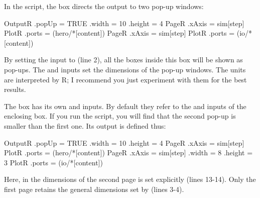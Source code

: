 In the  script, the  box directs the output to two pop-up windows:

\lstset{numbers=left}
\begin{boxscript}
OutputR {
	.popUp = TRUE
	.width = 10
	.height = 4
	PageR {
		.xAxis = sim[step]
		PlotR {
			.ports = (hero/*[content])
		}
	}
	PageR {
		.xAxis = sim[step]
		PlotR {
			.ports = (io/*[content])
		}
	}
}
\end{boxscript}
\lstset{numbers=none}

By setting the  input to  (line 2), all the  boxes inside this  box will be shown as pop-ups. The  and  inputs set the dimensions of the pop-up windows. The units are interpreted by R; I recommend you just experiment with them for the best results.

The  box has its own  and  inputs. By default they refer to the  and  inputs of the enclosing  box. If you run the  script, you will find that the second pop-up is smaller than the first one. Its output is defined thus:

\lstset{numbers=left}
\begin{boxscript}
OutputR {
	.popUp = TRUE
	.width = 10
	.height = 4
	PageR {
		.xAxis = sim[step]
		PlotR {
			.ports = (hero/*[content])
		}
	}
	PageR {
		.xAxis = sim[step]
		.width = 8
		.height = 3
		PlotR {
			.ports = (io/*[content])
		}
	}
}
\end{boxscript}
\lstset{numbers=none}

Here, in the dimensions of the second page is set explicitly (lines 13-14). Only the first page retains the general dimensions set by  (lines 3-4).

